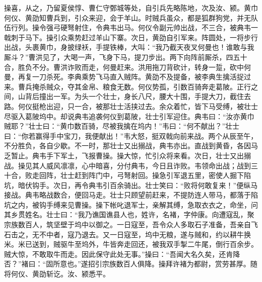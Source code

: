 操喜，从之，乃留夏侯惇、曹仁守鄄城等处，自引兵先略陈地，次及汝、颍。黄巾何仪、黄劭知曹兵到，引众来迎，会于羊山。时贼兵虽众，都是狐群狗党，并无队伍行列。操令强弓硬弩射住，令典韦出马。何仪令副元帅出战，不三合，被典韦一戟刺于马下。操引众乘势赶过羊山下寨。次日，黄劭自引军来。阵圆处，一将步行出战，头裹黄巾，身披绿袄，手提铁棒，大叫：“我乃截天夜叉何曼也！谁敢与我厮斗？”曹洪见了，大喝一声，飞身下马，提刀步出。两下向阵前厮杀，四五十合，胜负不分。曹洪诈败而走，何曼赶来。洪用拖刀背砍计，转身一踅，砍中何曼，再复一刀杀死。李典乘势飞马直入贼阵。黄劭不及提备，被李典生擒活捉过来。曹兵掩杀贼众，夺其金帛、粮食无数。何仪势孤，引数百骑奔走葛陂。正行之间，山背后撞出一军。为头一个壮士，身长八尺，腰大十围，手提大刀，截住去路。何仪挺枪出迎，只一合，被那壮士活挟过去。余众着忙，皆下马受缚，被壮士尽驱入葛陂坞中。却说典韦追袭何仪到葛陂，壮士引军迎住。典韦曰：“汝亦黄巾贼耶？”壮士曰：“黄巾数百骑，尽被我擒在坞内！”韦曰：“何不献出？”壮士曰：“你若赢得手中宝刀，我便献出！”韦大怒，挺双戟向前来战。两个从辰至午，不分胜负，各自少歇。不一时，那壮士又出搦战，典韦亦出。直战到黄昏，各因马乏暂止。典韦手下军土，飞报曹操。操大惊，忙引众将来看。次日，壮士又出搦战。操见其人威风凛凛，心中暗喜，分付典韦，今日且诈败。韦领命出战；战到三十合，败走回阵，壮士赶到阵门中，弓弩射回。操急引军退五里，密使人掘下陷坑，暗伏钩手。次日，再令典韦引百余骑出。壮士笑曰：“败将何敢复来！”便纵马接战。典韦略战数合，便回马走。壮士只顾望前赶来，不提防连人带马，都落于陷坑之内，被钩手缚来见曹操。操下帐叱退军士，亲解其缚，急取衣衣之，命坐，问其乡贯姓名。壮士曰：“我乃谯国谯县人也，姓许，名褚，字仲康。向遭寇乱，聚宗族数百人，筑坚壁于坞中以御之。一日寇至，吾令众人多取石子准备，吾亲自飞石击之，无不中者，寇乃退去。又一日寇至，坞中无粮，遂与贼和，约以耕牛换米。米已送到，贼驱牛至坞外，牛皆奔走回还，被我双手掣二牛尾，倒行百余步。贼大惊，不敢取牛而走。因此保守此处无事。”操曰：“吾闻大名久矣，还肯降否？”褚曰：“固所意也。”遂招引宗族数百人俱降。操拜许褚为都尉，赏劳甚厚。随将何仪、黄劭斩讫。汝、颍悉平。

